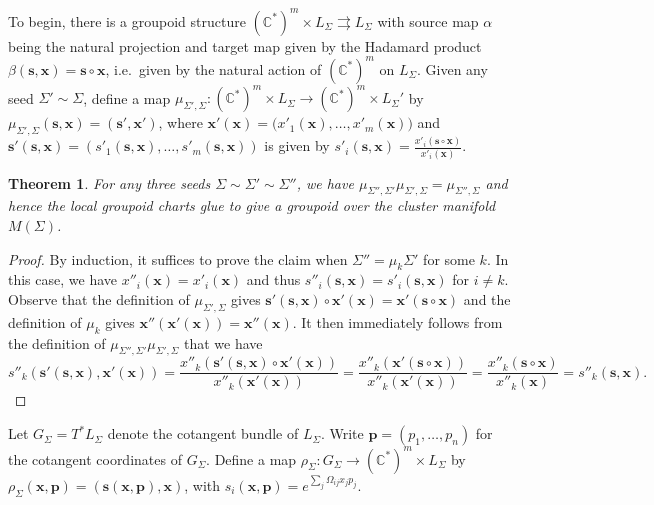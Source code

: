\documentclass{amsart}
\newtheorem{theorem}{Theorem}[section]
\newcommand{\bfp}{\mathbf{p}}
\newcommand{\bfs}{\mathbf{s}}
\newcommand{\bfx}{\mathbf{x}}
\newcommand{\CC}{\mathbb{C}}
\begin{document}
To begin, there is a groupoid structure $(\CC^*)^m\times L_\Sigma\rightrightarrows L_\Sigma$ with source map $\alpha$ being the natural projection and target map given by the Hadamard product $\beta(\bfs,\bfx)=\bfs\circ\bfx$, i.e.\ given by the natural action of $(\CC^*)^m$ on $L_\Sigma$.
Given any seed $\Sigma'\sim\Sigma$, define a map $\mu_{\Sigma',\Sigma}:(\CC^*)^m\times L_\Sigma\to(\CC^*)^m\times L_\Sigma'$ by $\mu_{\Sigma',\Sigma}(\bfs,\bfx)=(\bfs',\bfx')$, where $\bfx'(\bfx)=\big(x'_1(\bfx),\ldots,x'_m(\bfx)\big)$ and $\bfs'(\bfs,\bfx)=(s'_1(\bfs,\bfx),\ldots,s'_m(\bfs,\bfx))$ is given by $s'_i(\bfs,\bfx)=\frac{x'_i(\bfs\circ\bfx)}{x'_i(\bfx)}$.
\begin{theorem}
  For any three seeds $\Sigma\sim\Sigma'\sim\Sigma''$, we have $\mu_{\Sigma'',\Sigma'}\mu_{\Sigma',\Sigma}=\mu_{\Sigma'',\Sigma}$ and hence the local groupoid charts glue to give a groupoid over the cluster manifold $M(\Sigma)$.
\end{theorem}
\begin{proof}
  By induction, it suffices to prove the claim when $\Sigma''=\mu_k\Sigma'$ for some $k$.
  In this case, we have $x''_i(\bfx)=x'_i(\bfx)$ and thus $s''_i(\bfs,\bfx)=s'_i(\bfs,\bfx)$ for $i\ne k$.
  Observe that the definition of $\mu_{\Sigma',\Sigma}$ gives $\bfs'(\bfs,\bfx)\circ\bfx'(\bfx)=\bfx'(\bfs\circ\bfx)$ and the definition of $\mu_k$ gives $\bfx''(\bfx'(\bfx))=\bfx''(\bfx)$.
  It then immediately follows from the definition of $\mu_{\Sigma'',\Sigma'}\mu_{\Sigma',\Sigma}$ that we have
  \[s''_k(\bfs'(\bfs,\bfx),\bfx'(\bfx))=\frac{x''_k(\bfs'(\bfs,\bfx)\circ\bfx'(\bfx))}{x''_k(\bfx'(\bfx))}=\frac{x''_k(\bfx'(\bfs\circ\bfx))}{x''_k(\bfx'(\bfx))}=\frac{x''_k(\bfs\circ\bfx)}{x''_k(\bfx)}=s''_k(\bfs,\bfx).\]
\end{proof}

Let $G_\Sigma=T^*L_\Sigma$ denote the cotangent bundle of $L_\Sigma$.
Write $\bfp=(p_1,\ldots,p_n)$ for the cotangent coordinates of $G_\Sigma$.
Define a map $\rho_\Sigma:G_\Sigma\to(\CC^*)^m\times L_\Sigma$ by $\rho_\Sigma(\bfx,\bfp)=(\bfs(\bfx,\bfp),\bfx)$, with $s_i(\bfx,\bfp)=e^{\sum_j\Omega_{ij}x_jp_j}$.
\end{document}
